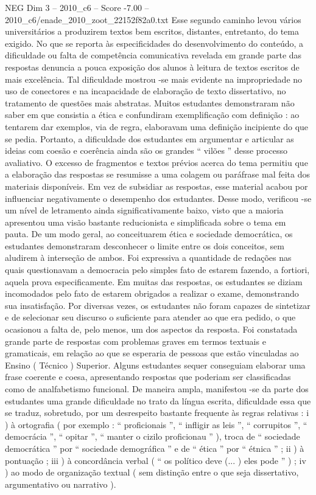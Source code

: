 \begin{textsample}{NEG Dim 3 – 2010\_c6 – Score -7.00 – 2010\_c6/enade\_2010\_zoot\_22152f82a0.txt}
Esse segundo caminho levou vários universitários a produzirem textos bem escritos, distantes, entretanto, do tema exigido.
No que se reporta às especificidades do desenvolvimento do conteúdo, a dificuldade ou falta de competência comunicativa revelada em grande parte das respostas denuncia a pouca exposição dos alunos à leitura de textos escritos de mais excelência.
Tal dificuldade mostrou -se mais evidente na impropriedade no uso de conectores e na incapacidade de elaboração de texto dissertativo, no tratamento de questões mais abstratas.
Muitos estudantes demonstraram não saber em que consistia a ética e confundiram exemplificação com definição : ao tentarem dar exemplos, via de regra, elaboravam uma definição incipiente do que se pedia.
Portanto, a dificuldade dos estudantes em argumentar e articular as ideias com coesão e coerência ainda são os grandes “ vilões ” desse processo avaliativo.
O excesso de fragmentos e textos prévios acerca do tema permitiu que a elaboração das respostas se resumisse a uma colagem ou paráfrase mal feita dos materiais disponíveis.
Em vez de subsidiar as respostas, esse material acabou por influenciar negativamente o desempenho dos estudantes.
Desse modo, verificou -se um nível de letramento ainda significativamente baixo, visto que a maioria apresentou uma visão bastante reducionista e simplificada sobre o tema em pauta.
De um modo geral, ao conceituarem ética e sociedade democrática, os estudantes demonstraram desconhecer o limite entre os dois conceitos, sem aludirem à interseção de ambos.
Foi expressiva a quantidade de redações nas quais questionavam a democracia pelo simples fato de estarem fazendo, a fortiori, aquela prova especificamente.
Em muitas das respostas, os estudantes se diziam incomodados pelo fato de estarem obrigados a realizar o exame, demonstrando sua insatisfação.
Por diversas vezes, os estudantes não foram capazes de sintetizar e de selecionar seu discurso o suficiente para atender ao que era pedido, o que ocasionou a falta de, pelo menos, um dos aspectos da resposta.
Foi constatada grande parte de respostas com problemas graves em termos textuais e gramaticais, em relação ao que se esperaria de pessoas que estão vinculadas ao Ensino ( Técnico ) Superior.
Alguns estudantes sequer conseguiam elaborar uma frase coerente e coesa, apresentando respostas que poderiam ser classificadas como de analfabetismo funcional.
De maneira ampla, manifestou -se da parte dos estudantes uma grande dificuldade no trato da língua escrita, dificuldade essa que se traduz, sobretudo, por um desrespeito bastante frequente às regras relativas : i ) à ortografia ( por exemplo : “ proficionais ”, “ infligir as leis ”, “ corrupitos ”, “ democrácia ”, “ opitar ”, “ manter o cizilo proficionau ” ), troca de “ sociedade democrática ” por “ sociedade demográfica ” e de “ ética ” por “ étnica ” ; ii ) à pontuação ; iii ) à concordância verbal ( “ os político deve (... ) eles pode ” ) ; iv ) ao modo de organização textual ( sem distinção entre o que seja dissertativo, argumentativo ou narrativo ).

\end{textsample}
